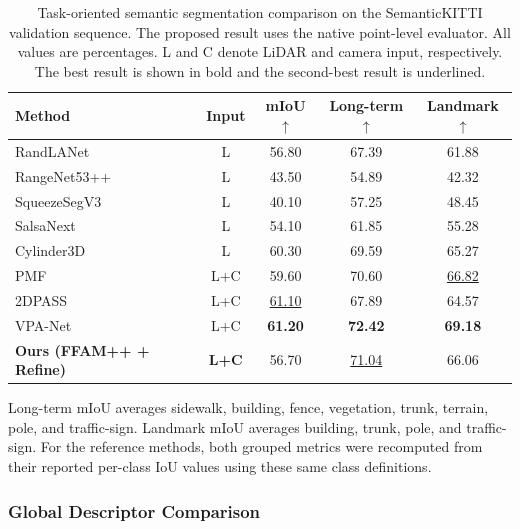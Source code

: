 \begin{table}[t]
  \centering
  \caption{Task-oriented semantic segmentation comparison on the
  SemanticKITTI validation sequence. The proposed result uses the native
  point-level evaluator. All values are percentages. L and C
  denote LiDAR and camera input, respectively. The best result is shown in
  bold and the second-best result is underlined.}
  \label{tab:semantic-kitti-task-oriented-comparison}
  \small
  \setlength{\tabcolsep}{2.7pt}
  \renewcommand{\arraystretch}{1.08}
  \begin{tabular}{@{}lcccc@{}}
    \toprule
    Method & Input & mIoU$\uparrow$ & Long-term$\uparrow$ & Landmark$\uparrow$ \\
    \midrule
    RandLANet~\cite{hu2020randlanetefficientsemanticsegmentation}    & L   & 56.80 & 67.39 & 61.88 \\
    RangeNet53++~\cite{milioto2019iros} & L   & 43.50 & 54.89 & 42.32 \\
    SqueezeSegV3~\cite{xu2020squeezesegv3} & L   & 40.10 & 57.25 & 48.45 \\
    SalsaNext~\cite{cortinhal2024salsanextfastuncertaintyawaresemantic}    & L   & 54.10 & 61.85 & 55.28 \\
    Cylinder3D~\cite{zhou2020cylinder3deffective3dframework}   & L   & 60.30 & 69.59 & 65.27 \\
    PMF~\cite{Tan2024}          & L+C & 59.60 & 70.60 & \underline{66.82} \\
    2DPASS~\cite{yan20222dpass2dpriorsassisted}       & L+C & \underline{61.10} & 67.89 & 64.57 \\
    VPA-Net~\cite{Lin2025}      & L+C & \textbf{61.20} & \textbf{72.42} & \textbf{69.18} \\
    \midrule
    \textbf{Ours (FFAM++ + Refine)}
                 & \textbf{L+C} & 56.70 & \underline{71.04} & 66.06 \\
    \bottomrule
  \end{tabular}
  \vspace{1mm}

  \parbox{\columnwidth}{\footnotesize
  Long-term mIoU averages sidewalk, building, fence, vegetation, trunk,
  terrain, pole, and traffic-sign. Landmark mIoU averages building, trunk,
  pole, and traffic-sign. For the reference methods, both grouped metrics
  were recomputed from their reported per-class IoU values using these same
  class definitions.}
\end{table}

\subsubsection{Global Descriptor Comparison}~\label{subsubsec:global-descriptor-comparison}

